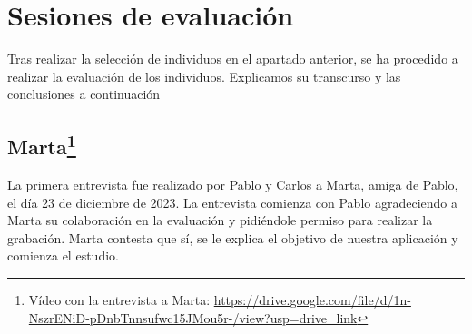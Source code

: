 \section{Sesiones de evaluación}

Tras realizar la selección de individuos en el apartado anterior, se ha procedido a realizar la evaluación de los individuos. Explicamos
su transcurso y las conclusiones a continuación

\subsection[Marta]{Marta\footnote{Vídeo con la entrevista a Marta: \url{https://drive.google.com/file/d/1n-NszrENiD-pDnbTnnsufwc15JMou5r-/view?usp=drive_link}}}

La primera entrevista fue realizado por Pablo y Carlos a Marta, amiga de Pablo, el día 23 de diciembre de 2023. La entrevista
comienza con Pablo agradeciendo a Marta su colaboración en la evaluación y pidiéndole permiso para realizar la grabación. Marta
contesta que sí, se le explica el objetivo de nuestra aplicación y comienza el estudio.

